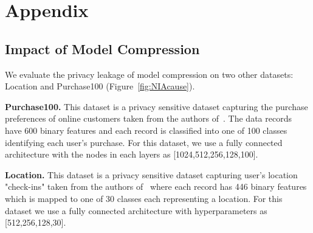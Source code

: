 \section*{Appendix}

\subsection*{Impact of Model Compression}

We evaluate the privacy leakage of model compression on two other datasets: Location and Purchase100 (Figure~\ref{fig:NIAcause}).

\noindent\textbf{Purchase100.} This dataset is a privacy sensitive dataset capturing the purchase preferences of online customers taken from the authors of~\cite{shokri2017membership}.
The data records have 600 binary features and each record is classified into one of 100 classes identifying each user's purchase.
For this dataset, we use a fully connected architecture with the nodes in each layers as [1024,512,256,128,100].

\noindent\textbf{Location.} This dataset is a privacy sensitive dataset capturing user's location "check-ins" taken from the authors of~\cite{shokri2017membership} where each record has 446 binary features which is mapped to one of 30 classes each representing a location. For this dataset we use a fully connected architecture with hyperparameters as [512,256,128,30].




